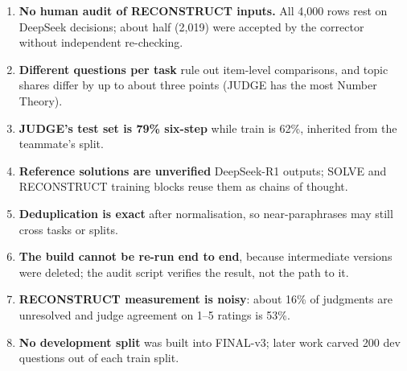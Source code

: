 \documentclass[11pt,a4paper]{article}
\begin{document}
\begin{enumerate}
\item \textbf{No human audit of RECONSTRUCT inputs.} All 4,000 rows rest on DeepSeek decisions; about half (2,019) were accepted by the corrector without independent re-checking.
\item \textbf{Different questions per task} rule out item-level comparisons, and topic shares differ by up to about three points (JUDGE has the most Number Theory).
\item \textbf{JUDGE's test set is 79\% six-step} while train is 62\%, inherited from the teammate's split.
\item \textbf{Reference solutions are unverified} DeepSeek-R1 outputs; SOLVE and RECONSTRUCT training blocks reuse them as chains of thought.
\item \textbf{Deduplication is exact} after normalisation, so near-paraphrases may still cross tasks or splits.
\item \textbf{The build cannot be re-run end to end}, because intermediate versions were deleted; the audit script verifies the result, not the path to it.
\item \textbf{RECONSTRUCT measurement is noisy}: about 16\% of judgments are unresolved and judge agreement on 1--5 ratings is 53\%.
\item \textbf{No development split} was built into FINAL-v3; later work carved 200 dev questions out of each train split.
\end{enumerate}
\end{document}
